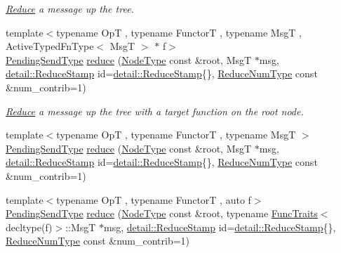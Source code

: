 \begin{DoxyCompactItemize}
\begin{DoxyCompactList}\small\item\em \hyperlink{structvt_1_1collective_1_1reduce_1_1_reduce}{Reduce} a message up the tree. \end{DoxyCompactList}\item 
{\footnotesize template$<$typename OpT , typename FunctorT , typename MsgT , Active\+Typed\+Fn\+Type$<$ Msg\+T $>$ $\ast$ f$>$ }\\\hyperlink{structvt_1_1collective_1_1reduce_1_1_reduce_a0474b491f3c93014d9a0ce0356c6bfd5}{Pending\+Send\+Type} \hyperlink{structvt_1_1collective_1_1reduce_1_1_reduce_a1b5753c2a9b1ce49415d313752f720aa}{reduce} (\hyperlink{namespacevt_a866da9d0efc19c0a1ce79e9e492f47e2}{Node\+Type} const \&root, MsgT $\ast$msg, \hyperlink{namespacevt_1_1collective_1_1reduce_1_1detail_abcd205dec83706f347d55c7528bf2664}{detail\+::\+Reduce\+Stamp} id=\hyperlink{namespacevt_1_1collective_1_1reduce_1_1detail_abcd205dec83706f347d55c7528bf2664}{detail\+::\+Reduce\+Stamp}\{\}, \hyperlink{structvt_1_1collective_1_1reduce_1_1_reduce_a6c3e63aca10c31d2823b0b18cf9762a4}{Reduce\+Num\+Type} const \&num\+\_\+contrib=1)
\begin{DoxyCompactList}\small\item\em \hyperlink{structvt_1_1collective_1_1reduce_1_1_reduce}{Reduce} a message up the tree with a target function on the root node. \end{DoxyCompactList}\item 
{\footnotesize template$<$typename OpT , typename FunctorT , typename MsgT $>$ }\\\hyperlink{structvt_1_1collective_1_1reduce_1_1_reduce_a0474b491f3c93014d9a0ce0356c6bfd5}{Pending\+Send\+Type} \hyperlink{structvt_1_1collective_1_1reduce_1_1_reduce_abac393d6b92dc86e4b1ecdef07cec2c0}{reduce} (\hyperlink{namespacevt_a866da9d0efc19c0a1ce79e9e492f47e2}{Node\+Type} const \&root, MsgT $\ast$msg, \hyperlink{namespacevt_1_1collective_1_1reduce_1_1detail_abcd205dec83706f347d55c7528bf2664}{detail\+::\+Reduce\+Stamp} id=\hyperlink{namespacevt_1_1collective_1_1reduce_1_1detail_abcd205dec83706f347d55c7528bf2664}{detail\+::\+Reduce\+Stamp}\{\}, \hyperlink{structvt_1_1collective_1_1reduce_1_1_reduce_a6c3e63aca10c31d2823b0b18cf9762a4}{Reduce\+Num\+Type} const \&num\+\_\+contrib=1)
\item 
{\footnotesize template$<$typename OpT , typename FunctorT , auto f$>$ }\\\hyperlink{structvt_1_1collective_1_1reduce_1_1_reduce_a0474b491f3c93014d9a0ce0356c6bfd5}{Pending\+Send\+Type} \hyperlink{structvt_1_1collective_1_1reduce_1_1_reduce_a7389031519cb9fd1b8dde2c3b19db7e0}{reduce} (\hyperlink{namespacevt_a866da9d0efc19c0a1ce79e9e492f47e2}{Node\+Type} const \&root, typename \hyperlink{structvt_1_1_func_traits}{Func\+Traits}$<$ decltype(f)$>$\+::MsgT $\ast$msg, \hyperlink{namespacevt_1_1collective_1_1reduce_1_1detail_abcd205dec83706f347d55c7528bf2664}{detail\+::\+Reduce\+Stamp} id=\hyperlink{namespacevt_1_1collective_1_1reduce_1_1detail_abcd205dec83706f347d55c7528bf2664}{detail\+::\+Reduce\+Stamp}\{\}, \hyperlink{structvt_1_1collective_1_1reduce_1_1_reduce_a6c3e63aca10c31d2823b0b18cf9762a4}{Reduce\+Num\+Type} const \&num\+\_\+contrib=1)

\end{DoxyCompactItemize}
